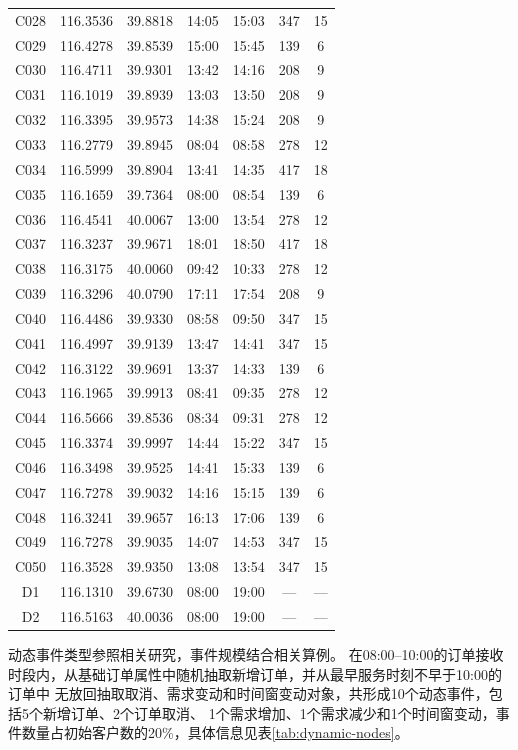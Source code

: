\documentclass{setp-new}
\begin{document}
\begin{supertabular*}{\textwidth}{@{\extracolsep{\fill}}ccccccc@{}}
C028 & 116.3536 & 39.8818 & 14:05 & 15:03 & 347 & 15\\
C029 & 116.4278 & 39.8539 & 15:00 & 15:45 & 139 & 6\\
C030 & 116.4711 & 39.9301 & 13:42 & 14:16 & 208 & 9\\
C031 & 116.1019 & 39.8939 & 13:03 & 13:50 & 208 & 9\\
C032 & 116.3395 & 39.9573 & 14:38 & 15:24 & 208 & 9\\
C033 & 116.2779 & 39.8945 & 08:04 & 08:58 & 278 & 12\\
C034 & 116.5999 & 39.8904 & 13:41 & 14:35 & 417 & 18\\
C035 & 116.1659 & 39.7364 & 08:00 & 08:54 & 139 & 6\\
C036 & 116.4541 & 40.0067 & 13:00 & 13:54 & 278 & 12\\
C037 & 116.3237 & 39.9671 & 18:01 & 18:50 & 417 & 18\\
C038 & 116.3175 & 40.0060 & 09:42 & 10:33 & 278 & 12\\
C039 & 116.3296 & 40.0790 & 17:11 & 17:54 & 208 & 9\\
C040 & 116.4486 & 39.9330 & 08:58 & 09:50 & 347 & 15\\
C041 & 116.4997 & 39.9139 & 13:47 & 14:41 & 347 & 15\\
C042 & 116.3122 & 39.9691 & 13:37 & 14:33 & 139 & 6\\
C043 & 116.1965 & 39.9913 & 08:41 & 09:35 & 278 & 12\\
C044 & 116.5666 & 39.8536 & 08:34 & 09:31 & 278 & 12\\
C045 & 116.3374 & 39.9997 & 14:44 & 15:22 & 347 & 15\\
C046 & 116.3498 & 39.9525 & 14:41 & 15:33 & 139 & 6\\
C047 & 116.7278 & 39.9032 & 14:16 & 15:15 & 139 & 6\\
C048 & 116.3241 & 39.9657 & 16:13 & 17:06 & 139 & 6\\
C049 & 116.7278 & 39.9035 & 14:07 & 14:53 & 347 & 15\\
C050 & 116.3528 & 39.9350 & 13:08 & 13:54 & 347 & 15\\
D1 & 116.1310 & 39.6730 & 08:00 & 19:00 & --- & ---\\
D2 & 116.5163 & 40.0036 & 08:00 & 19:00 & --- & ---\\
\end{supertabular*}
\tablehead{}\tabletail{}\tablelasttail{}
\endgroup

动态事件类型参照相关研究\cite{ref:71}，事件规模结合相关算例\cite{ref:51}。
在08:00--10:00的订单接收时段内，从基础订单属性中随机抽取新增订单，并从最早服务时刻不早于10:00的订单中
无放回抽取取消、需求变动和时间窗变动对象，共形成10个动态事件，包括5个新增订单、2个订单取消、
1个需求增加、1个需求减少和1个时间窗变动，事件数量占初始客户数的20\%，具体信息见表\ref{tab:dynamic-nodes}。
\end{document}
